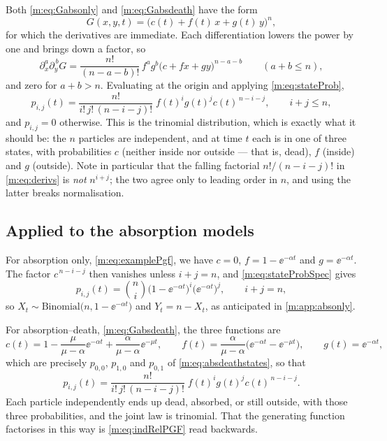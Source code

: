 Both \cref{m:eq:Gabsonly} and \cref{m:eq:Gabsdeath} have the form
\begin{equation}
\label{m:eq:multilinear}
G(x,y,t) = \bigl(c(t) + f(t)\,x + g(t)\,y\bigr)^n ,
\end{equation}
for which the derivatives are immediate. Each differentiation lowers the power by
one and brings down a factor, so
\begin{equation}
\label{m:eq:derivs}
\partial_x^{a}\partial_y^{\,b}G
= \frac{n!}{(n-a-b)!}\,f^{a}g^{b}\bigl(c+fx+gy\bigr)^{n-a-b}
\qquad(a+b\le n),
\end{equation}
and zero for $a+b>n$. Evaluating at the origin and applying \cref{m:eq:stateProb},
\begin{equation}
\label{m:eq:stateProbSpec}
p_{i,j}(t) = \frac{n!}{i!\,j!\,(n-i-j)!}\;f(t)^{i}g(t)^{j}c(t)^{\,n-i-j},
\qquad i+j\le n,
\end{equation}
and $p_{i,j}=0$ otherwise. This is the trinomial distribution, which is exactly
what it should be: the $n$ particles are independent, and at time $t$ each is in
one of three states, with probabilities $c$ (neither inside nor outside --- that
is, dead), $f$ (inside) and $g$ (outside). Note in particular that the falling
factorial $n!/(n-i-j)!$ in \cref{m:eq:derivs} is \emph{not} $n^{i+j}$; the two agree
only to leading order in $n$, and using the latter breaks normalisation.

\subsection*{Applied to the absorption models}

For absorption only, \cref{m:eq:examplePgf}, we have $c=0$, $f = 1-\ee^{-\alpha t}$
and $g = \ee^{-\alpha t}$. The factor $c^{\,n-i-j}$ then vanishes unless $i+j=n$,
and \cref{m:eq:stateProbSpec} gives
\begin{equation*}
p_{i,j}(t) = \binom{n}{i}\bigl(1-\ee^{-\alpha t}\bigr)^{i}\bigl(\ee^{-\alpha t}\bigr)^{j},
\qquad i+j=n,
\end{equation*}
so $X_t\sim\text{Binomial}\bigl(n,1-\ee^{-\alpha t}\bigr)$ and $Y_t = n-X_t$, as
anticipated in \cref{m:app:absonly}.

For absorption--death, \cref{m:eq:Gabsdeath}, the three functions are
\begin{equation*}
c(t) = 1-\frac{\mu}{\mu-\alpha}\ee^{-\alpha t} + \frac{\alpha}{\mu-\alpha}\ee^{-\mu t},
\qquad
f(t) = \frac{\alpha}{\mu-\alpha}\bigl(\ee^{-\alpha t}-\ee^{-\mu t}\bigr),
\qquad
g(t) = \ee^{-\alpha t},
\end{equation*}
which are precisely $p_{0,0}$, $p_{1,0}$ and $p_{0,1}$ of
\cref{m:eq:absdeathstates}, so that
\begin{equation*}
p_{i,j}(t) = \frac{n!}{i!\,j!\,(n-i-j)!}\;f(t)^{i}g(t)^{j}c(t)^{\,n-i-j} .
\end{equation*}
Each particle independently ends up dead, absorbed, or still outside, with those
three probabilities, and the joint law is trinomial. That the generating function
factorises in this way is \cref{m:eq:indRelPGF} read backwards.


